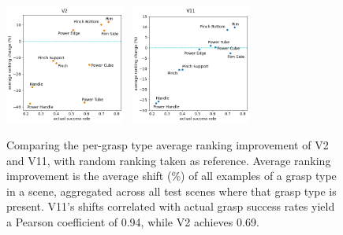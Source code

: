 \begin{figure}[h]
\begin{center}
\includegraphics[width=0.35\textwidth]{images/post-analysis/V2_suc_rate_vs_improvement.png}~
\includegraphics[width=0.35\textwidth]{images/post-analysis/V11_suc_rate_vs_improvement.png}
\caption{Comparing the per-grasp type average ranking improvement of V2 and V11, with random ranking taken as reference. Average ranking improvement is the average shift (\%) of all examples of a grasp type in a scene, aggregated across all test scenes where that grasp type is present. V11's shifts correlated with actual grasp success rates yield a Pearson coefficient of 0.94, while V2 achieves 0.69. \label{fig:v2_vs_v11_rates}}
\end{center}
\end{figure}



